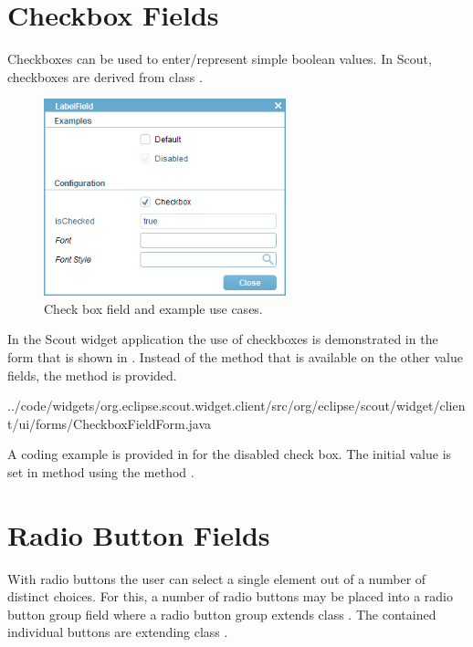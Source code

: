\documentclass[a4paper,10pt,twoside]{book}
\begin{document}
{%
\section{Checkbox Fields}

Checkboxes can be used to enter/represent simple boolean values. 
In Scout, checkboxes are derived from class . 

\begin{figure}
\includegraphics[width=7cm]{checkboxfield.png}
\caption{Check box field and example use cases.
}
\end{figure}

In the Scout widget application the use of checkboxes is demonstrated in the form  that is shown in .
Instead of the method  that is available on the other value fields, the method  is provided.


{../code/widgets/org.eclipse.scout.widget.client/src/org/eclipse/scout/widget/client/ui/forms/CheckboxFieldForm.java}

A coding example is provided in  for the disabled check box. 
The initial value is set in method  using the method .

\section{Radio Button Fields}

With radio buttons the user can select a single element out of a number of distinct choices. 
For this, a number of radio buttons may be placed into a radio button group field where a radio button group extends class .
The contained individual buttons are extending class .

}
\end{document}
